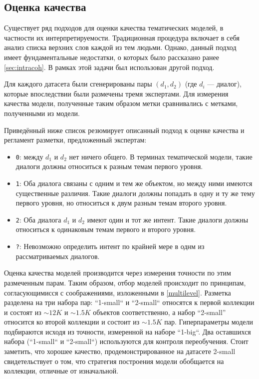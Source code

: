 \subsection{Оценка качества}
Существует ряд подходов для оценки качества тематических моделей, в частности их интерпретируемости. Традиционная процедура включает в себя анализ списка верхних слов каждой из тем людьми. Однако, данный подход имеет фундаментальные недостатки, о которых было рассказано ранее \ref{sec:intracoh}. В рамках этой задачи был использован другой подход.

Для каждого датасета были сгенерированы пары $(d_1, d_2)$ (где $d_i$ --- диалог), которые впоследствии были размечены тремя экспертами. Для измерения качества модели, полученные таким образом метки сравнивались с метками, полученными из модели.

Приведённый ниже список резюмирует описанный подход к оценке качества и регламент разметки, предложенный экспертам:

\begin{itemize}
    \item \texttt{0}: между $d_1$ и $d_2$ нет ничего общего. В терминах тематической модели, такие диалоги должны относиться к разным темам первого уровня.
    \item \texttt{1}: Оба диалога связаны с одним и тем же объектом, но между ними имеются существенные различия. Такие диалоги должны попадать в одну и ту же тему первого уровня, но относиться к двум разным темам второго уровня.
    \item \texttt{2}: Оба диалога $d_1$ и $d_2$ имеют один и тот же интент. Такие диалоги должны относиться к одинаковым темам первого и второго уровня.
    \item \texttt{?}: Невозможно определить интент по крайней мере в однм из рассматриваемых диалогов.
\end{itemize}

Оценка качества моделей производится через измерения точности по этим размеченным парам. Таким образом, отбор моделей происходит по принципам, согласующимисся с соображениями, изложенными в \ref{multilevel}. 
Разметка разделена на три набора пар: ``1-small`` и ``2-small`` относятся к первой коллекции и состоят из $\sim\!12K$ и $\sim1.5K$ объектов соответственно, а набор ``2-small'' относится ко второй коллекции и состоит из $\sim\!1.5K$ пар. Гиперпараметры модели подбираются исходя из точности, измеренной на  наборе ``1-big``. Два оставшихся набора (``1-small`` и ``2-small``) используются для контроля переобучения. Стоит заметить, что хорошее качество, продемонстрированное на датасете 2-small свидетельствует о том, что стратегия построения модели обобщается на коллекции, отличные от изначальной.



